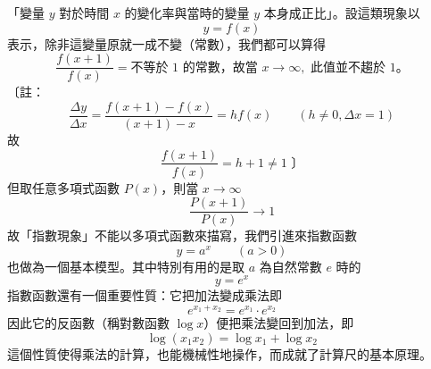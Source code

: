 「變量 $y$ 對於時間 $x$ 的變化率與當時的變量 $y$ 本身成正比」。設這類現象以
\[ y = f(x) \]
表示，除非這變量原就一成不變（常數），我們都可以算得
\[ \dfrac{f(x+1)}{f(x)} = \text{不等於 1 的常數，故當 } x \longrightarrow \infty, \text{ 此值並不趨於 1。} \]
〔註：
\[ \dfrac{\Delta y}{\Delta x} = \dfrac{f(x+1)-f(x)}{(x+1)-x} = h f(x) \qquad (h \ne 0, \Delta x = 1) \]
故
\[ \dfrac{f(x+1)}{f(x)} = h+1 \ne 1 \text{ 〕} \]
但取任意多項式函數 $P(x)$，則當 $x \longrightarrow \infty$
\[ \dfrac{P(x+1)}{P(x)} \longrightarrow 1 \]
故「指數現象」不能以多項式函數來描寫，我們引進來指數函數
\begin{equation}
y = a^x \qquad (a > 0) \label{eq:b6s-3-11}
\end{equation}
也做為一個基本模型。其中特別有用的是取 $a$ 為自然常數 $e$ 時的
\begin{equation}
y = e^x \label{eq:b6s-3-12}
\end{equation}
指數函數還有一個重要性質：它把加法變成乘法即
\begin{equation}
e^{x_1+x_2} = e^{x_1} \cdot e^{x_2} \label{eq:b6s-3-13}
\end{equation}
因此它的反函數（稱對數函數 $\log x$）便把乘法變回到加法，即
\begin{equation}
\log(x_1 x_2) = \log x_1 + \log x_2 \label{eq:b6s-3-14}
\end{equation}
這個性質使得乘法的計算，也能機械性地操作，而成就了計算尺的基本原理。

\newpage

